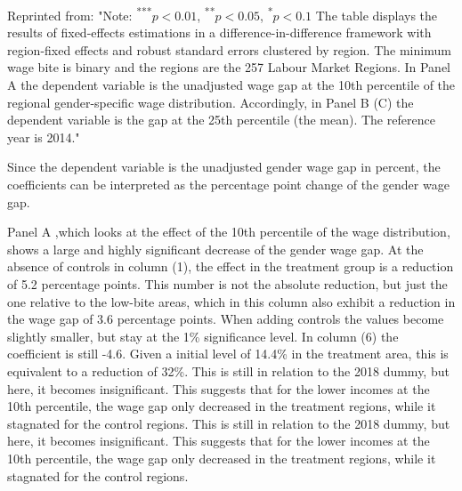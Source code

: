 \documentclass[12pt,draft,a4paper]{article}
\begin{document}
\begin{table}[htbp]
\begin{adjustbox}{width=\textwidth}
\begin{tabular}{lllllll}
    \end{tabular}
    \end{adjustbox}
    Reprinted from:
        \citet[][Table 2]{CALIENDO22}
        "Note:
        \textsuperscript{***}$p < 0.01$, 
        \textsuperscript{**}$p < 0.05$, 
        \textsuperscript{*}$p < 0.1$     
        The table displays the results of ﬁxed-eﬀects estimations in a diﬀerence-in-diﬀerence framework with region-ﬁxed eﬀects and robust standard errors clustered by region. The minimum wage bite is binary and the regions are the 257 Labour Market Regions. In Panel A the dependent variable is the unadjusted wage gap at the 10th percentile of the regional gender-speciﬁc wage distribution. Accordingly, in Panel B (C) the dependent variable is the gap at the 25th percentile (the mean). The reference year is 2014." 

    
    \label{tab:main}
    
    \end{table}

Since the dependent variable is the unadjusted gender wage gap in percent, the coefficients can be interpreted as  the percentage point change of the gender wage gap.

Panel A ,which looks at the effect of the 10th percentile of the wage distribution, shows a large and highly significant decrease of the gender wage gap. 
At the absence of controls in column (1), the effect in the treatment group is a reduction of 5.2 percentage points. This number is not the absolute reduction, but just the one relative to the low-bite areas, which in this column also exhibit a reduction in the wage gap of 3.6 percentage points.
When adding controls the values become slightly smaller, but stay at the 1\% significance level. In column (6) the coefficient is still -4.6. Given a initial level of 14.4\% in the treatment area, this is equivalent to a reduction of 32\%.
This is still in relation to the 2018 dummy, but here, it becomes insignificant. This suggests that for the lower incomes at the 10th percentile, the wage gap only decreased in the treatment regions, while it stagnated for the control regions.
This is still in relation to the 2018 dummy, but here, it becomes insignificant. This suggests that for the lower incomes at the 10th percentile, 
the wage gap only decreased in the treatment regions, while it stagnated for the control regions.
\end{document}
